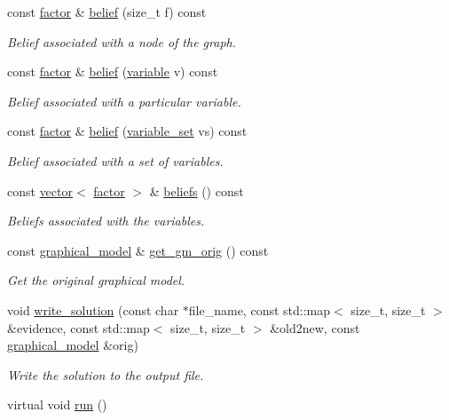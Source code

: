\begin{DoxyCompactItemize}
const \hyperlink{classmerlin_1_1factor}{factor} \& \hyperlink{classmerlin_1_1bte_a8e08df0db094f22edd4067a6b78975bb}{belief} (size\+\_\+t f) const 
\begin{DoxyCompactList}\small\item\em Belief associated with a node of the graph. \end{DoxyCompactList}\item 
const \hyperlink{classmerlin_1_1factor}{factor} \& \hyperlink{classmerlin_1_1bte_acead5460cd29483aa0736a6aca0e73d3}{belief} (\hyperlink{classmerlin_1_1variable}{variable} v) const 
\begin{DoxyCompactList}\small\item\em Belief associated with a particular variable. \end{DoxyCompactList}\item 
const \hyperlink{classmerlin_1_1factor}{factor} \& \hyperlink{classmerlin_1_1bte_af18f05f849f6fd0efadfd98735aac98c}{belief} (\hyperlink{classmerlin_1_1variable__set}{variable\+\_\+set} vs) const 
\begin{DoxyCompactList}\small\item\em Belief associated with a set of variables. \end{DoxyCompactList}\item 
const \hyperlink{classmerlin_1_1vector}{vector}$<$ \hyperlink{classmerlin_1_1factor}{factor} $>$ \& \hyperlink{classmerlin_1_1bte_a4a10aa68792892ac1d6ab9c8ccfcf44e}{beliefs} () const 
\begin{DoxyCompactList}\small\item\em Beliefs associated with the variables. \end{DoxyCompactList}\item 
const \hyperlink{classmerlin_1_1graphical__model}{graphical\+\_\+model} \& \hyperlink{classmerlin_1_1bte_a2590c3185b58a10637529a314fed8c22}{get\+\_\+gm\+\_\+orig} () const \hypertarget{classmerlin_1_1bte_a2590c3185b58a10637529a314fed8c22}{}\label{classmerlin_1_1bte_a2590c3185b58a10637529a314fed8c22}

\begin{DoxyCompactList}\small\item\em Get the original graphical model. \end{DoxyCompactList}\item 
void \hyperlink{classmerlin_1_1bte_a1f744fcbf182c2d00381246f2d355b13}{write\+\_\+solution} (const char $\ast$file\+\_\+name, const std\+::map$<$ size\+\_\+t, size\+\_\+t $>$ \&evidence, const std\+::map$<$ size\+\_\+t, size\+\_\+t $>$ \&old2new, const \hyperlink{classmerlin_1_1graphical__model}{graphical\+\_\+model} \&orig)
\begin{DoxyCompactList}\small\item\em Write the solution to the output file. \end{DoxyCompactList}\item 
virtual void \hyperlink{classmerlin_1_1bte_a4ac6d3a739619c5066ffe9cfdfb8aaaf}{run} ()\hypertarget{classmerlin_1_1bte_a4ac6d3a739619c5066ffe9cfdfb8aaaf}{}\label{classmerlin_1_1bte_a4ac6d3a739619c5066ffe9cfdfb8aaaf}


\end{DoxyCompactItemize}
